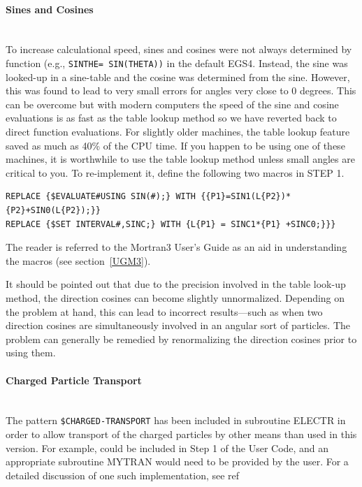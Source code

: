 \paragraph{Sines and Cosines}

\mbox{}\\
To increase calculational speed, sines and cosines were not always
determined by function (e.g., {\tt SINTHE= SIN(THETA))} in the default
 EGS4.  Instead, the sine was looked-up in a sine-table and the cosine
was determined from the sine.  However, this was found to lead to very
small errors for angles very close to 0 degrees\cite{LR94a}.  This can
be overcome but with modern computers the speed of the sine and cosine
evaluations is as fast as the table lookup method so we have reverted back
to direct function evaluations.  For slightly older machines, the table
lookup feature saved as much as 40\% of the CPU time.  If you happen
to be using one of these machines, it is worthwhile to use the table
lookup method unless small angles are critical to you.  To re-implement
it, define the following two macros in STEP 1.
\begin{verbatim}
REPLACE {$EVALUATE#USING SIN(#);} WITH {{P1}=SIN1(L{P2})*{P2}+SIN0(L{P2});}}
REPLACE {$SET INTERVAL#,SINC;} WITH {L{P1} = SINC1*{P1} +SINC0;}}}
\end{verbatim}
The reader is referred to the Mortran3 User's Guide as an
aid in understanding the macros (see section~\ref{UGM3}).


It should be pointed out that due to the precision involved in the table
look-up method, the direction cosines can become slightly unnormalized.
Depending on the problem at hand, this can lead to incorrect results---such
as when two direction cosines are simultaneously involved in an angular
sort of particles.  The problem can generally be remedied by renormalizing
the direction cosines prior to using them.


\paragraph{Charged Particle Transport}
\mbox{}\\
The pattern {\tt \$CHARGED-TRANSPORT} has been included in subroutine ELECTR in
order to allow transport of the charged particles by other means than used
in this version.  For example,  could be included in Step 1 of the User Code,
and an appropriate subroutine MYTRAN would need to be provided by
the user.  For a detailed discussion of one such implementation, see
ref\cite{Bi89a,Bi93}



